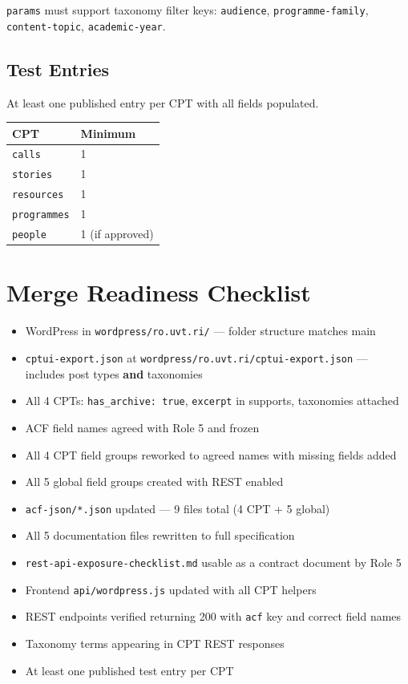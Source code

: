 \documentclass[12pt,a4paper]{article}
\begin{document}
\texttt{params} must support taxonomy filter keys: \texttt{audience}, \texttt{programme-family},
\texttt{content-topic}, \texttt{academic-year}.

\subsection{Test Entries}

At least one published entry per CPT with all fields populated.

\vspace{0.4em}
\begin{tabular}{@{}p{3cm}p{9.3cm}@{}}
\toprule
\rowcolor{uvtLightBlue}
\textbf{CPT} & \textbf{Minimum} \\
\midrule
\texttt{calls} & 1 \\
\texttt{stories} & 1 \\
\texttt{resources} & 1 \\
\texttt{programmes} & 1 \\
\texttt{people} & 1 (if approved) \\
\bottomrule
\end{tabular}

\section{Merge Readiness Checklist}

\begin{itemize}
    \item[$\square$] WordPress in \texttt{wordpress/ro.uvt.ri/} --- folder structure matches main
    \item[$\square$] \texttt{cptui-export.json} at \texttt{wordpress/ro.uvt.ri/cptui-export.json} --- includes post types \textbf{and} taxonomies
    \item[$\square$] All 4 CPTs: \texttt{has\_archive: true}, \texttt{excerpt} in supports, taxonomies attached
    \item[$\square$] ACF field names agreed with Role 5 and frozen
    \item[$\square$] All 4 CPT field groups reworked to agreed names with missing fields added
    \item[$\square$] All 5 global field groups created with REST enabled
    \item[$\square$] \texttt{acf-json/*.json} updated --- 9 files total (4 CPT + 5 global)
    \item[$\square$] All 5 documentation files rewritten to full specification
    \item[$\square$] \texttt{rest-api-exposure-checklist.md} usable as a contract document by Role 5
    \item[$\square$] Frontend \texttt{api/wordpress.js} updated with all CPT helpers
    \item[$\square$] REST endpoints verified returning 200 with \texttt{acf} key and correct field names
    \item[$\square$] Taxonomy terms appearing in CPT REST responses
    \item[$\square$] At least one published test entry per CPT
\end{itemize}
\end{document}
